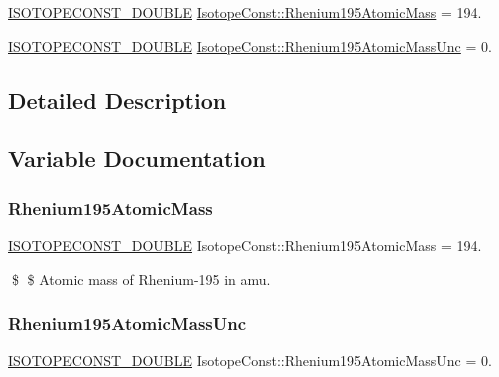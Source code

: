 \begin{DoxyCompactItemize}
\item 
\mbox{\hyperlink{group___isotope_const-_macros_ga8f45a7272ce02c0b4c65c44636ed719a}{I\+S\+O\+T\+O\+P\+E\+C\+O\+N\+S\+T\+\_\+\+D\+O\+U\+B\+LE}} \mbox{\hyperlink{group___isotope_const-_rhenium-_re195_ga7504af281b25d5a84af50024bed58a51}{Isotope\+Const\+::\+Rhenium195\+Atomic\+Mass}} = 194.
\item 
\mbox{\hyperlink{group___isotope_const-_macros_ga8f45a7272ce02c0b4c65c44636ed719a}{I\+S\+O\+T\+O\+P\+E\+C\+O\+N\+S\+T\+\_\+\+D\+O\+U\+B\+LE}} \mbox{\hyperlink{group___isotope_const-_rhenium-_re195_gaa2e89c77946e1065bc6e05ebf597866e}{Isotope\+Const\+::\+Rhenium195\+Atomic\+Mass\+Unc}} = 0.
\end{DoxyCompactItemize}


\subsection{Detailed Description}


\subsection{Variable Documentation}
\mbox{\label{group___isotope_const-_rhenium-_re195_ga7504af281b25d5a84af50024bed58a51}} 
\subsubsection{\texorpdfstring{Rhenium195\+Atomic\+Mass}{Rhenium195AtomicMass}}
{\footnotesize\ttfamily \mbox{\hyperlink{group___isotope_const-_macros_ga8f45a7272ce02c0b4c65c44636ed719a}{I\+S\+O\+T\+O\+P\+E\+C\+O\+N\+S\+T\+\_\+\+D\+O\+U\+B\+LE}} Isotope\+Const\+::\+Rhenium195\+Atomic\+Mass = 194.}

\$ \$ Atomic mass of Rhenium-\/195 in amu. \mbox{\label{group___isotope_const-_rhenium-_re195_gaa2e89c77946e1065bc6e05ebf597866e}} 
\subsubsection{\texorpdfstring{Rhenium195\+Atomic\+Mass\+Unc}{Rhenium195AtomicMassUnc}}
{\footnotesize\ttfamily \mbox{\hyperlink{group___isotope_const-_macros_ga8f45a7272ce02c0b4c65c44636ed719a}{I\+S\+O\+T\+O\+P\+E\+C\+O\+N\+S\+T\+\_\+\+D\+O\+U\+B\+LE}} Isotope\+Const\+::\+Rhenium195\+Atomic\+Mass\+Unc = 0.}

